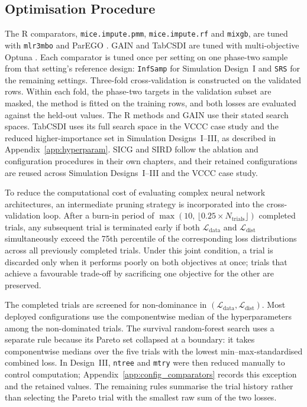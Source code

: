 \subsection{Optimisation Procedure}

The R comparators, \texttt{mice.impute.pmm}, \texttt{mice.impute.rf} and \texttt{mixgb}, are tuned with \texttt{mlr3mbo} and ParEGO \citep{bischl2024hyperparameter, knowles2006parego}. GAIN and TabCSDI are tuned with multi-objective Optuna \citep{Akiba2019}. Each comparator is tuned once per setting on one phase-two sample from that setting's reference design: \texttt{InfSamp} for Simulation Design~I and \texttt{SRS} for the remaining settings. Three-fold cross-validation is constructed on the validated rows. Within each fold, the phase-two targets in the validation subset are masked, the method is fitted on the training rows, and both losses are evaluated against the held-out values. The R methods and GAIN use their stated search spaces. TabCSDI uses its full search space in the VCCC case study and the reduced higher-importance set in Simulation Designs~I--III, as described in Appendix~\ref{app:hyperparam}. SICG and SIRD follow the ablation and configuration procedures in their own chapters, and their retained configurations are reused across Simulation Designs~I--III and the VCCC case study.

To reduce the computational cost of evaluating complex neural network architectures, an intermediate pruning strategy is incorporated into the cross-validation loop. After a burn-in period of $\max(10,\, \lfloor 0.25 \times N_{\mathrm{trials}} \rfloor)$ completed trials, any subsequent trial is terminated early if both $\mathcal{L}_{\mathrm{data}}$ and $\mathcal{L}_{\mathrm{dist}}$ simultaneously exceed the 75th percentile of the corresponding loss distributions across all previously completed trials. Under this joint condition, a trial is discarded only when it performs poorly on both objectives at once; trials that achieve a favourable trade-off by sacrificing one objective for the other are preserved.

The completed trials are screened for non-dominance in $(\mathcal{L}_{\mathrm{data}},\mathcal{L}_{\mathrm{dist}})$. Most deployed configurations use the componentwise median of the hyperparameters among the non-dominated trials. The survival random-forest search uses a separate rule because its Pareto set collapsed at a boundary: it takes componentwise medians over the five trials with the lowest min--max-standardised combined loss. In Design~III, \texttt{ntree} and \texttt{mtry} were then reduced manually to control computation; Appendix~\ref{app:config_comparators} records this exception and the retained values. The remaining rules summarise the trial history rather than selecting the Pareto trial with the smallest raw sum of the two losses.

